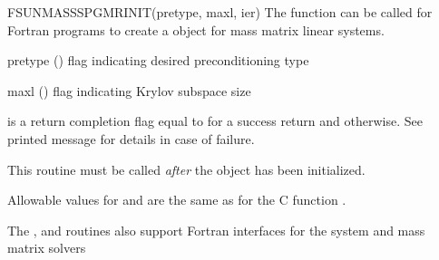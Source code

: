 {
  FSUNMASSSPGMRINIT(pretype, maxl, ier)
}
{
  The function  can be called for Fortran programs
  to create a {\sunlinsolspgmr} object for mass matrix linear systems.
}
{
  \begin{args}[pretype]
  \item[pretype] ()
    flag indicating desired preconditioning type
  \item[maxl] ()
    flag indicating Krylov subspace size
  \end{args}
}
{
   is a  return completion flag equal to  for a success
  return and  otherwise. See printed message for details in case
  of failure.
}
{
  This routine must be called \emph{after} the {\nvector} object has
  been initialized. 

  Allowable values for  and  are the same as for
  the C function . 
}
The , 
and  routines also support Fortran
interfaces for the system and mass matrix solvers

